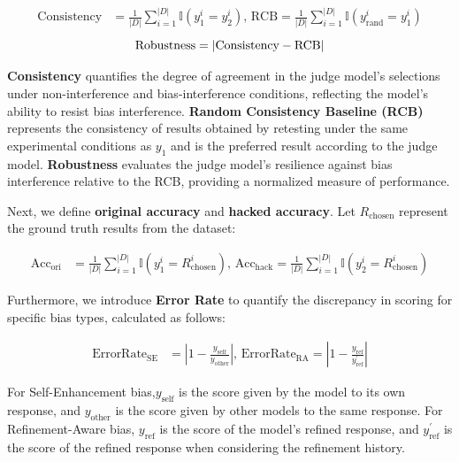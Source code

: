 \documentclass{article} %
\begin{document}
\vspace{-18pt}
\begin{align*}
\text{Consistency} &= \frac{1}{|D|} \sum_{i=1}^{|D|} \mathbb{I}(y_{1}^{i} = y_{2}^{i}),\,
\text{RCB} = \frac{1}{|D|} \sum_{i=1}^{|D|} \mathbb{I}(y_{\text{rand}}^{i} = y_{1}^{i})
\end{align*}
\vspace{-4pt}
\[
\setlength{\abovedisplayskip}{0pt}
\setlength{\belowdisplayskip}{0pt}
\text{Robustness} = |\text{Consistency} - \text{RCB}|
\]
\vspace{-18pt}

\textbf{Consistency} quantifies the degree of agreement in the judge model's selections under non-interference and bias-interference conditions, reflecting the model's ability to resist bias interference. \textbf{Random Consistency Baseline (RCB)} represents the consistency of results obtained by retesting under the same experimental conditions as \( y_1 \) and is the preferred result according to the judge model. \textbf{Robustness} evaluates the judge model's resilience against bias interference relative to the RCB, providing a normalized measure of performance.

Next, we define \textbf{original accuracy} and \textbf{hacked accuracy}. Let \( R_{\text{chosen}} \) represent the ground truth results from the dataset:

\vspace{-14pt}
\begin{align*}
\text{Acc}_{\text{ori}} &= \frac{1}{|D|} \sum_{i=1}^{|D|} \mathbb{I}(y_{1}^{i} = R_{\text{chosen}}^{i}),\,
\text{Acc}_{\text{hack}} = \frac{1}{|D|} \sum_{i=1}^{|D|} \mathbb{I}(y_{2}^{i} = R_{\text{chosen}}^{i})
\end{align*}

\vspace{-9pt}

Furthermore, we introduce \textbf{Error Rate} to quantify the discrepancy in scoring for specific bias types, calculated as follows:

\vspace{-12pt}
    \begin{align*}
\text{ErrorRate}_{\text{SE}} &= \left|1 - \frac{y_{\text{self}}}{y_{\text{other}}}\right|,\,
\text{ErrorRate}_{\text{RA}} = \left|1 - \frac{y_{\text{ref}}}{y^{'}_{\text{ref}}}\right|
\end{align*}
\vspace{-9pt}

For Self-Enhancement bias,\(y_{\text{self}}\) is the score given by the model to its own response, and \(y_{\text{other}}\) is the score given by other models to the same response. For Refinement-Aware bias, \(y_{\text{ref}}\) is the score of the model's refined response, and \(y^{'}_{\text{ref}}\) is the score of the refined response when considering the refinement history.
\end{document}
